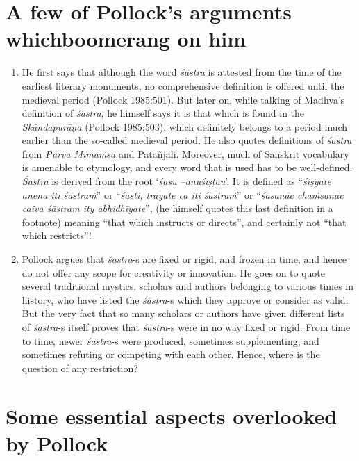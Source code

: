 \section*{A few of Pollock’s arguments which\newline boomerang on him}

\begin{enumerate}
\item He first says that although the word {\it śāstra} is attested from the time of the earliest literary monuments, no comprehensive definition is offered until the medieval period (Pollock 1985:501). But later on, while talking of Madhva's definition of {\it śāstra}, he himself says it is that which is found in the {\it Skāndapurāṇa} (Pollock 1985:503), which definitely belongs to a period much earlier than the so-called medieval period. He also quotes definitions of {\it śāstra} from \textit{Pūrva Mīmāṁsā} and Patañjali. Moreover, much of Sanskrit vocabulary is amenable to  etymology, and every word that is used has to be well-defined. {\it Śāstra} is derived from the root `\textit{śāsu --anuśiṣṭau}'. It is defined as ``\textit{śiṣyate anena iti śāstraṁ}'' or ``\textit{śāsti, trāyate ca iti śāstraṁ}'' or ``\textit{śāsanāc chaṁsanāc caiva śāstram ity abhidhīyate}'', (he himself quotes this last definition in a footnote) meaning ``that which instructs or directs'', and certainly not ``that which restricts''!

\item Pollock argues that {\it śāstra}-s are fixed or rigid, and frozen in time, and hence do not offer any scope for creativity or innovation. He goes on to quote several traditional mystics, scholars and authors belonging to various times in history, who have listed the {\it śāstra}-s which they approve or consider as valid. But the very fact that so many scholars or authors have given different lists of {\it śāstra}-s itself proves that {\it śāstra}-s were in no way fixed or rigid. From time to time, newer {\it śāstra}-s were produced, sometimes supplementing, and sometimes refuting or competing with each other. Hence, where is the question of any restriction?
\end{enumerate}

\section*{Some essential aspects overlooked by Pollock}

